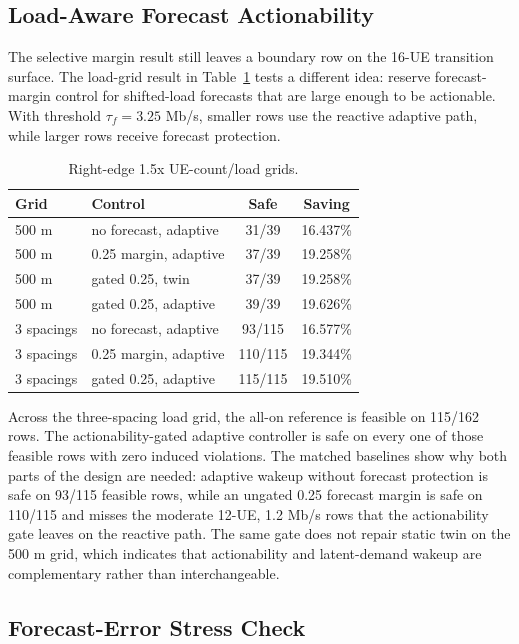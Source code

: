 \documentclass[10pt,twocolumn]{article}
\begin{document}
\subsection{Load-Aware Forecast Actionability}

The selective margin result still leaves a boundary row on the 16-UE transition
surface.  The load-grid result in Table~\ref{tab:load-grid} tests a different
idea: reserve forecast-margin control for shifted-load forecasts that are large
enough to be actionable.  With threshold $\tau_f=3.25$ Mb/s, smaller rows use
the reactive adaptive path, while larger rows receive forecast protection.

\begin{table}[H]
\centering
\caption{Right-edge 1.5x UE-count/load grids.}
\label{tab:load-grid}
\small
\begin{tabular}{@{}p{}p{}cc@{}}
\toprule
Grid & Control & Safe & Saving \\
\midrule
500 m & no forecast, adaptive & 31/39 & 16.437\% \\
500 m & 0.25 margin, adaptive & 37/39 & 19.258\% \\
500 m & gated 0.25, twin & 37/39 & 19.258\% \\
500 m & gated 0.25, adaptive & 39/39 & 19.626\% \\
3 spacings & no forecast, adaptive & 93/115 & 16.577\% \\
3 spacings & 0.25 margin, adaptive & 110/115 & 19.344\% \\
3 spacings & gated 0.25, adaptive & 115/115 & 19.510\% \\
\bottomrule
\end{tabular}
\end{table}

Across the three-spacing load grid, the all-on reference is feasible on
115/162 rows.  The actionability-gated adaptive controller is safe on every one
of those feasible rows with zero induced violations.  The matched baselines
show why both parts of the design are needed: adaptive wakeup without forecast
protection is safe on 93/115 feasible rows, while an ungated 0.25 forecast
margin is safe on 110/115 and misses the moderate 12-UE, 1.2 Mb/s rows that
the actionability gate leaves on the reactive path.  The same gate does not
repair static twin on the 500 m grid, which indicates that actionability and
latent-demand wakeup are complementary rather than interchangeable.

\subsection{Forecast-Error Stress Check}
\end{document}

